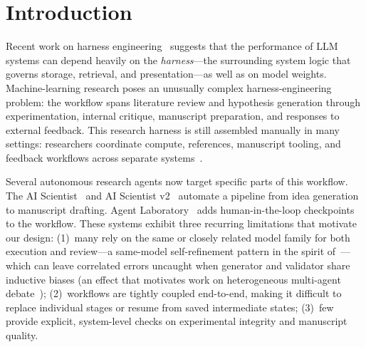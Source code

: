 \documentclass{article}
\theoremstyle{remark}
\begin{document}
 \section{Introduction}
\label{sec:intro}


Recent work on harness engineering~\citep{lee2026metaharness} suggests that the performance of LLM systems can depend heavily on the \emph{harness}---the surrounding system logic that governs storage, retrieval, and presentation---as well as on model weights.
Machine-learning research poses an unusually complex harness-engineering problem: the workflow spans literature review and hypothesis generation through experimentation, internal critique, manuscript preparation, and responses to external feedback.
This research harness is still assembled manually in many settings: researchers coordinate compute, references, manuscript tooling, and feedback workflows across separate systems~\citep{lu2024aiscientist,schmidgall2025agentrxiv}.

Several autonomous research agents now target specific parts of this workflow.
The AI Scientist~\citep{lu2024aiscientist} and AI Scientist v2~\citep{yamada2025aiscientistv2} automate a pipeline from idea generation to manuscript drafting.
Agent Laboratory~\citep{schmidgall2025agentrxiv}
adds human-in-the-loop checkpoints to the workflow.
These systems exhibit three recurring limitations that motivate our design:
(1)~many rely on the same or closely related model family for both execution and review---a same-model self-refinement pattern in the spirit of~\citet{madaan2023selfrefine,shinn2023reflexion}---which can leave correlated errors uncaught when generator and validator share inductive biases (an effect that motivates work on heterogeneous multi-agent debate~\citealp{du2024multiagentdebate,liang2024divergent});
(2)~workflows are tightly coupled end-to-end, making it difficult to replace individual stages or resume from saved intermediate states;
(3)~few provide explicit, system-level checks on experimental integrity and manuscript quality.
\end{document}
